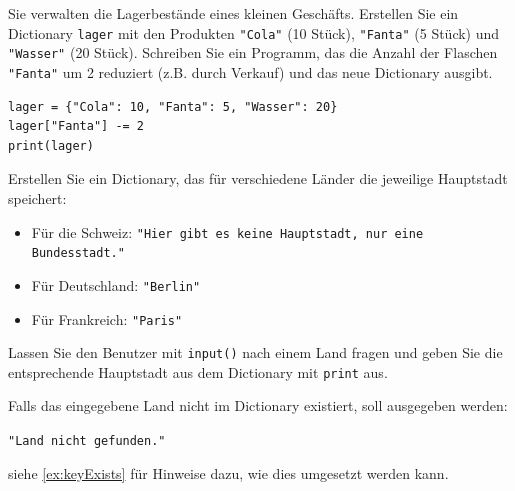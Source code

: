 \begin{myexercise}
	Sie verwalten die Lagerbestände eines kleinen Geschäfts. Erstellen Sie ein Dictionary \lstinline|lager| mit den Produkten \lstinline|"Cola"| (10 Stück), \lstinline|"Fanta"| (5 Stück) und \lstinline|"Wasser"| (20 Stück). Schreiben Sie ein Programm, das die Anzahl der Flaschen \lstinline|"Fanta"| um 2 reduziert (z.B. durch Verkauf) und das neue Dictionary ausgibt.

	\begin{myanswer}
		\begin{lstlisting}
lager = {"Cola": 10, "Fanta": 5, "Wasser": 20}
lager["Fanta"] -= 2
print(lager)
\end{lstlisting}
	\end{myanswer}
\end{myexercise}

\begin{myexercise}
	Erstellen Sie ein Dictionary, das für verschiedene Länder die jeweilige Hauptstadt speichert:
	\begin{itemize}
		\item Für die Schweiz: \lstinline|"Hier gibt es keine Hauptstadt, nur eine Bundesstadt."|
		\item Für Deutschland: \lstinline|"Berlin"|
		\item Für Frankreich: \lstinline|"Paris"|
	\end{itemize}

	Lassen Sie den Benutzer mit \lstinline|input()| nach einem Land fragen und geben Sie die entsprechende Hauptstadt aus dem Dictionary mit \lstinline|print| aus.

	Falls das eingegebene Land nicht im Dictionary existiert, soll ausgegeben werden:

	\lstinline|"Land nicht gefunden."|

	siehe \cref{ex:keyExists} für Hinweise dazu, wie dies umgesetzt werden kann.

	\begin{myanswer}
		
	\end{myanswer}
\end{myexercise}

